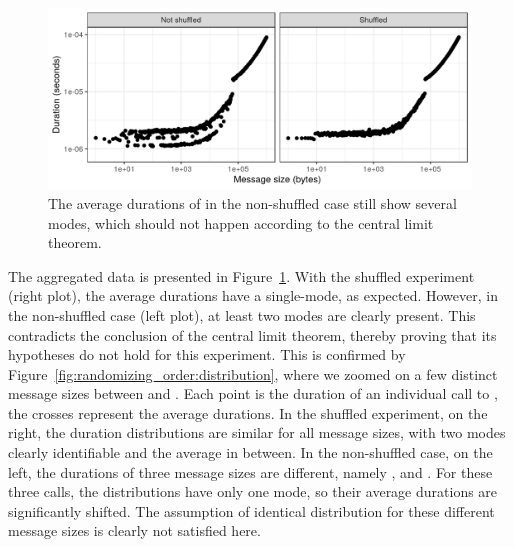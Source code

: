         \begin{figure}[htpb]
            \centering
            \includegraphics[width=\linewidth]{img/experiment/randomizing_order/aggregated_data.png}
            \caption{The average durations of \recv in the non-shuffled case still show several modes,
            which should not happen according to the central limit theorem.}%
            \label{fig:randomizing_order:avg_data}
        \end{figure}

        The aggregated data is presented in Figure~\ref{fig:randomizing_order:avg_data}. With the shuffled experiment
        (right plot), the average durations have a single-mode, as expected. However, in the non-shuffled case (left
        plot), at least two modes are clearly present. This contradicts the conclusion of the central limit theorem,
        thereby proving that its hypotheses do not hold for this experiment. This is confirmed by
        Figure~\ref{fig:randomizing_order:distribution}, where we zoomed on a few distinct message sizes between
         and . Each point is the duration of an individual call to \recv,
        the crosses represent the average durations. In the shuffled experiment, on the right, the duration
        distributions are similar for all message sizes, with two modes clearly identifiable and the average in between.
        In the non-shuffled case, on the left, the durations of three message sizes are different, namely
        ,  and . For these three calls, the distributions have only one
        mode, so their average durations are significantly shifted. The assumption of identical distribution for these
        different message sizes is clearly not satisfied here.

